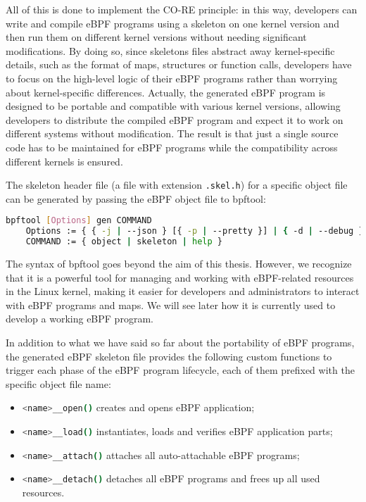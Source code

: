 All of this is done to implement the CO-RE principle: in this way, developers can write and compile eBPF programs using a skeleton on one kernel version and then run them on different kernel versions without needing significant modifications.
By doing so, since skeletons files abstract away kernel-specific details, such as the format of maps, structures or function calls, developers have to focus on the high-level logic of their eBPF programs rather than worrying about kernel-specific differences.
Actually, the generated eBPF program is designed to be portable and compatible with various kernel versions, allowing developers to distribute the compiled eBPF program and expect it to work on different systems without modification.
The result is that just a single source code has to be maintained for eBPF programs while the compatibility across different kernels is ensured.

The skeleton header file (a file with extension \colorbox{backcolour}{\lstinline[style=commandline, language=bash, breaklines=true]|.skel.h|}) for a specific object file can be generated by passing the eBPF object file to bpftool:

\begin{lstlisting}[style=commandline, language=bash, caption={bpftool command syntax.}]
	bpftool [Options] gen COMMAND
	Options := { { -j | --json } [{ -p | --pretty }] | { -d | --debug } | { -L | --use-loader } }
	COMMAND := { object | skeleton | help }
\end{lstlisting}

The syntax of bpftool goes beyond the aim of this thesis.
However, we recognize that it is a powerful tool for managing and working with eBPF-related resources in the Linux kernel, making it easier for developers and administrators to interact with eBPF programs and maps.
We will see later how it is currently used to develop a working eBPF program.

In addition to what we have said so far about the portability of eBPF programs, the generated eBPF skeleton file provides the following custom functions to trigger each phase of the eBPF program lifecycle, each of them prefixed with the specific object file name:

\begin{itemize}
	\item 
		\colorbox{backcolour}{\lstinline[style=commandline, language=bash, breaklines=true]|<name>__open()|} creates and opens eBPF application;
	\item 
		\colorbox{backcolour}{\lstinline[style=commandline, language=bash, breaklines=true]|<name>__load()|} instantiates, loads and verifies eBPF application parts;
	\item 
		\colorbox{backcolour}{\lstinline[style=commandline, language=bash, breaklines=true]|<name>__attach()|} attaches all auto-attachable eBPF programs;
	\item 	
		\colorbox{backcolour}{\lstinline[style=commandline, language=bash, breaklines=true]|<name>__detach()|} detaches all eBPF programs and frees up all used resources.
\end{itemize}

